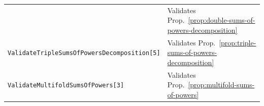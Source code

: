 \begin{center}
\begin{tabular}{ll}
    & Validates Prop.~\eqref{prop:double-sums-of-powers-decomposition} \\
    \texttt{ValidateTripleSumsOfPowersDecomposition[5]}
    & Validates Prop.~\eqref{prop:triple-sums-of-powers-decomposition} \\
    \texttt{ValidateMultifoldSumsOfPowers[3]}
    & Validates Prop.~\eqref{prop:multifold-sums-of-powers} \\
    \bottomrule
  \end{tabular}
\end{center}

